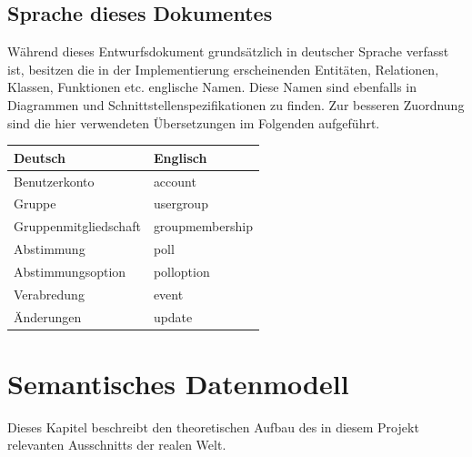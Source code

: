 \documentclass[parskip=full,11pt]{scrartcl}
\begin{document}
\pagebreak
\subsection{Sprache dieses Dokumentes}
Während dieses Entwurfsdokument grundsätzlich in deutscher Sprache verfasst
ist, besitzen die in der Implementierung erscheinenden Entitäten, Relationen,
Klassen, Funktionen etc. englische Namen.
Diese Namen sind ebenfalls in Diagrammen und Schnittstellenspezifikationen
zu finden.
Zur besseren Zuordnung sind die hier verwendeten Übersetzungen im Folgenden
aufgeführt.

\begin{tabular}[t]{ l l }
    \textbf{Deutsch} & \textbf{Englisch}\\
    \hline
    Benutzerkonto & account\\
    Gruppe & usergroup\\
		Gruppenmitgliedschaft & groupmembership\\
		Abstimmung & poll\\
		Abstimmungsoption & polloption\\
		Verabredung & event\\
		Änderungen & update\\


\end{tabular}

\pagebreak

\section{Semantisches Datenmodell}
Dieses Kapitel beschreibt den theoretischen Aufbau des in diesem Projekt
relevanten Ausschnitts der realen Welt.
\end{document}
